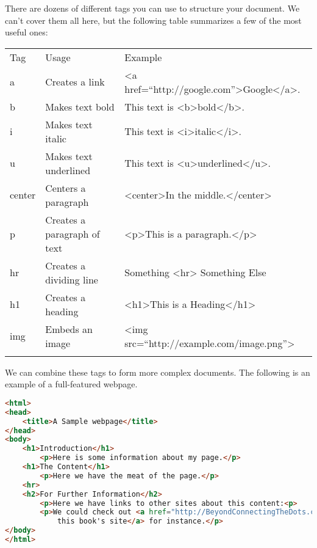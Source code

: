\documentclass[]{memoir}
\begin{document}
There are dozens of different tags you can use to structure your
document. We can't cover them all here, but the following table
summarizes a few of the most useful ones:

\begin{longtable}[c]{@{}lll@{}}
\hline\noalign{\medskip}
Tag & Usage & Example
\\\noalign{\medskip}
\hline\noalign{\medskip}
a & Creates a link & \textless{}a
href=``http://google.com''\textgreater{}Google\textless{}/a\textgreater{}.
\\\noalign{\medskip}
b & Makes text bold & This text is
\textless{}b\textgreater{}bold\textless{}/b\textgreater{}.
\\\noalign{\medskip}
i & Makes text italic & This text is
\textless{}i\textgreater{}italic\textless{}/i\textgreater{}.
\\\noalign{\medskip}
u & Makes text underlined & This text is
\textless{}u\textgreater{}underlined\textless{}/u\textgreater{}.
\\\noalign{\medskip}
center & Centers a paragraph & \textless{}center\textgreater{}In the
middle.\textless{}/center\textgreater{}
\\\noalign{\medskip}
p & Creates a paragraph of text & \textless{}p\textgreater{}This is a
paragraph.\textless{}/p\textgreater{}
\\\noalign{\medskip}
hr & Creates a dividing line & Something \textless{}hr\textgreater{}
Something Else
\\\noalign{\medskip}
h1 & Creates a heading & \textless{}h1\textgreater{}This is a
Heading\textless{}/h1\textgreater{}
\\\noalign{\medskip}
img & Embeds an image & \textless{}img
src=``http://example.com/image.png''\textgreater{}
\\\noalign{\medskip}
\hline
\end{longtable}

We can combine these tags to form more complex documents. The following
is an example of a full-featured webpage.

\begin{lstlisting}[language=HTML]
<html>
<head>
    <title>A Sample webpage</title>
</head>
<body>
    <h1>Introduction</h1>
        <p>Here is some information about my page.</p>
    <h1>The Content</h1>
        <p>Here we have the meat of the page.</p>
    <hr>
    <h2>For Further Information</h2>
        <p>Here we have links to other sites about this content:<p>
        <p>We could check out <a href="http://BeyondConnectingTheDots.com">
            this book's site</a> for instance.</p>
</body>
</html>
\end{lstlisting}
\end{document}
